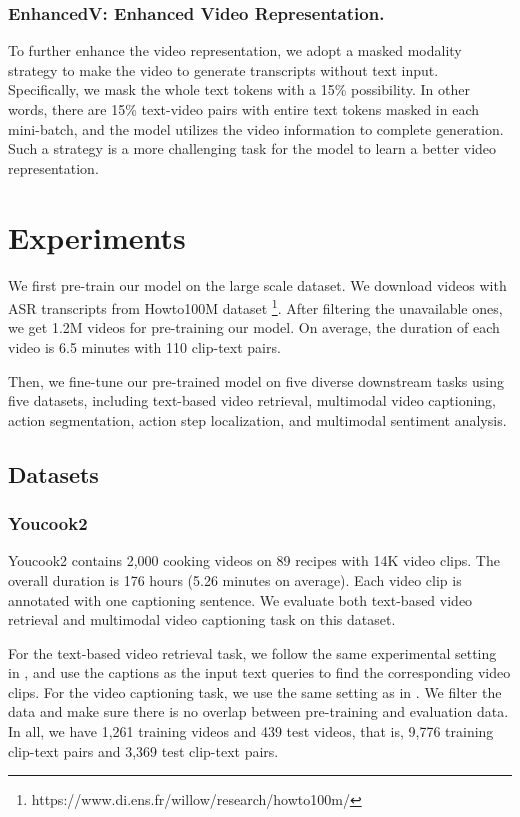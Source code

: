 \documentclass[11pt,a4paper]{article}
\begin{document}
	\subsubsection{EnhancedV: Enhanced Video Representation.}
	To further enhance the video representation, we adopt a masked modality strategy to make the video to generate transcripts without text input. Specifically, we mask the whole text tokens with a 15\% possibility. In other words, there are 15\% text-video pairs with entire text tokens masked in each mini-batch, and the model utilizes the video information to complete generation. Such a strategy is a more challenging task for the model to learn a better video representation.
	
	\section{Experiments}
	We first pre-train our model on the large scale dataset. We download videos with ASR transcripts from Howto100M dataset \cite{miech2019howto100m}\footnote{https://www.di.ens.fr/willow/research/howto100m/}. After filtering the unavailable ones, we get 1.2M videos for pre-training our model. On average, the duration of each video is 6.5 minutes with 110 clip-text pairs.
	
	Then, we fine-tune our pre-trained model on five diverse downstream tasks using five datasets, including text-based video retrieval, multimodal video captioning, action segmentation, action step localization, and multimodal sentiment analysis.
	
	\subsection{Datasets}
	\subsubsection{Youcook2} Youcook2 \cite{zhou2018towards} contains 2,000 cooking videos on 89 recipes with 14K video clips. The overall duration is 176 hours (5.26 minutes on average). Each video clip is annotated with one captioning sentence. We evaluate both text-based video retrieval and multimodal video captioning task on this dataset. 
	
	For the text-based video retrieval task, we follow the same experimental setting in \cite{miech2019howto100m}, and use the captions as the input text queries to find the corresponding video clips. For the video captioning task, we use the same setting as in \cite{shi2019dense}. We filter the data and make sure there is no overlap between pre-training and evaluation data. In all, we have 1,261 training videos and 439 test videos, that is, 9,776 training clip-text pairs and 3,369 test clip-text pairs. 
	
\end{document}
